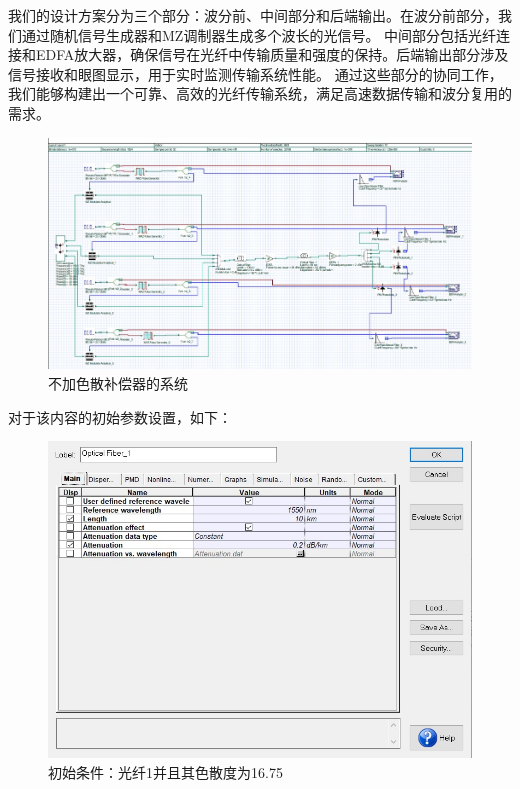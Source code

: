 \documentclass[12pt, a4paper, oneside]{article}
\begin{document}
\begin{spacing}{2.0}
我们的设计方案分为三个部分：波分前、中间部分和后端输出。在波分前部分，我们通过随机信号生成器和MZ调制器生成多个波长的光信号。
中间部分包括光纤连接和EDFA放大器，确保信号在光纤中传输质量和强度的保持。后端输出部分涉及信号接收和眼图显示，用于实时监测传输系统性能。
通过这些部分的协同工作，我们能够构建出一个可靠、高效的光纤传输系统，满足高速数据传输和波分复用的需求。
\begin{figure}[H]
	\centering
	\includegraphics[width=13cm]{figure3.png}
  \caption{不加色散补偿器的系统}
\end{figure}
\clearpage
对于该内容的初始参数设置，如下：

\begin{figure}[H]
  \centering
  \includegraphics[width=13cm]{figure4.png}
  \caption{初始条件：光纤1并且其色散度为16.75}
\end{figure}


\end{spacing}
\end{document}
